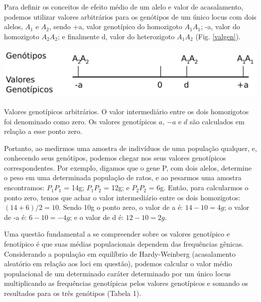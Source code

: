 \documentclass[portuges,]{tufte-handout}
\begin{document}
Para definir os conceitos de efeito médio de um alelo e valor de
acasalamento, podemos utilizar valores arbitrários para os genótipos de
um único locus com dois alelos, \(A_1\) e \(A_2\), sendo +a, valor
genotípico do homozigoto \(A_1\)\(A_1\); -a, valor do homozigoto
\(A_2\)\(A_2\); e finalmente d, valor do heterozigoto \(A_1\)\(A_2\)
(Fig. \ref{valgen}).

\begin{marginfigure}
\includegraphics{./figuras/valoresgenotipicos.png}
\caption{Valores genotípicos arbitrários. O valor intermediário
entre os dois homozigotos foi denominado como zero. Os valores
genotípicos \(a\), \(-a\) e \(d\) são calculados em relação a esse ponto
zero.}
\label{valgen}
\end{marginfigure}

Portanto, ao medirmos uma amostra de indivíduos de uma população
qualquer, e, conhecendo seus genótipos, podemos chegar nos seus valores
genotípicos correspondentes. Por exemplo, digamos que o gene P, com dois
alelos, determine o peso em uma determinada população de ratos, e ao
pesarmos uma amostra encontramos: \(P_1\)\(P_1\) = 14g; \(P_1\)\(P_2\) =
12g; e \(P_2\)\(P_2\) = 6g. Então, para calcularmos o ponto zero, temos
que achar o valor intermediário entre os dois homozigotos:
\((14 + 6)/2 = 10\). Sendo 10g o ponto zero, o valor de a é:
\(14-10 = 4g\); o valor de -a é: \(6-10 = -4g\); e o valor de d é:
\(12-10 = 2g\).

Uma questão fundamental a se compreender sobre os valores genotípico e
fenotípico é que suas médias populacionais dependem das frequências
gênicas. Considerando a população em equilíbrio de Hardy-Weinberg
(acasalamento aleatório em relação aos loci em questão), podemos
calcular o valor médio populacional de um determinado caráter
determinado por um único locus multiplicando as frequências genotípicas
pelos valores genotípicos e somando os resultados para os três genótipos
(Tabela 1).
\end{document}
